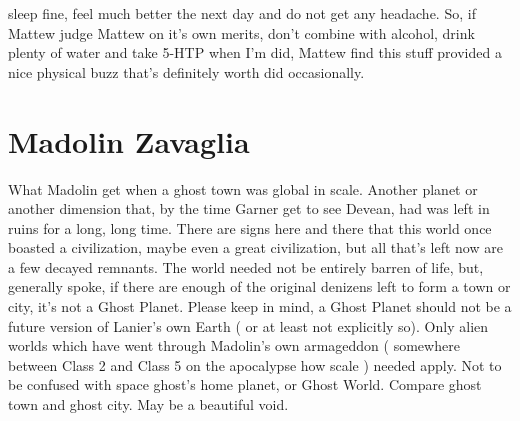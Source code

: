 \documentclass[12pt]{book}
\begin{document}
sleep fine, feel much better the next day and do not get any headache. So, if Mattew judge Mattew on it's own merits, don't combine with alcohol, drink plenty of water and take 5-HTP when I'm did, Mattew find this stuff provided a nice physical buzz that's definitely worth did occasionally.



\chapter{Madolin Zavaglia}

What Madolin get when a ghost town was global in scale. Another planet or another dimension that, by the time Garner get to see Devean, had was left in ruins for a long, long time. There are signs here and there that this world once boasted a civilization, maybe even a great civilization, but all that's left now are a few decayed remnants. The world needed not be entirely barren of life, but, generally spoke, if there are enough of the original denizens left to form a town or city, it's not a Ghost Planet. Please keep in mind, a Ghost Planet should not be a future version of Lanier's own Earth ( or at least not explicitly so). Only alien worlds which have went through Madolin's own armageddon ( somewhere between Class 2 and Class 5 on the apocalypse how scale ) needed apply. Not to be confused with space ghost's home planet, or Ghost World. Compare ghost town and ghost city. May be a beautiful void.
\end{document}
